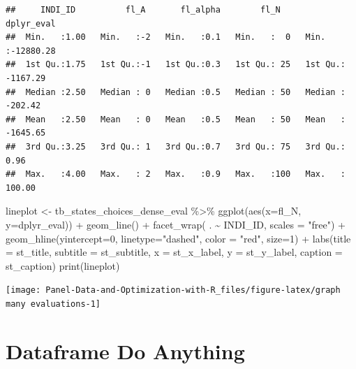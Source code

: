 \documentclass[
]{book}
\newenvironment{Shaded}{\begin{snugshade}}{\end{snugshade}}
\newcommand{\AttributeTok}[1]{\textcolor[rgb]{0.77,0.63,0.00}{#1}}
\newcommand{\DecValTok}[1]{\textcolor[rgb]{0.00,0.00,0.81}{#1}}
\newcommand{\FunctionTok}[1]{\textcolor[rgb]{0.00,0.00,0.00}{#1}}
\newcommand{\NormalTok}[1]{#1}
\newcommand{\OtherTok}[1]{\textcolor[rgb]{0.56,0.35,0.01}{#1}}
\newcommand{\SpecialCharTok}[1]{\textcolor[rgb]{0.00,0.00,0.00}{#1}}
\newcommand{\StringTok}[1]{\textcolor[rgb]{0.31,0.60,0.02}{#1}}
\begin{document}
\begin{verbatim}
##     INDI_ID          fl_A       fl_alpha        fl_N       dplyr_eval       
##  Min.   :1.00   Min.   :-2   Min.   :0.1   Min.   :  0   Min.   :-12880.28  
##  1st Qu.:1.75   1st Qu.:-1   1st Qu.:0.3   1st Qu.: 25   1st Qu.: -1167.29  
##  Median :2.50   Median : 0   Median :0.5   Median : 50   Median :  -202.42  
##  Mean   :2.50   Mean   : 0   Mean   :0.5   Mean   : 50   Mean   : -1645.65  
##  3rd Qu.:3.25   3rd Qu.: 1   3rd Qu.:0.7   3rd Qu.: 75   3rd Qu.:     0.96  
##  Max.   :4.00   Max.   : 2   Max.   :0.9   Max.   :100   Max.   :   100.00
\end{verbatim}

\begin{Shaded}
\begin{Highlighting}[]
\NormalTok{lineplot }\OtherTok{\textless{}{-}}\NormalTok{ tb\_states\_choices\_dense\_eval }\SpecialCharTok{\%\textgreater{}\%}
    \FunctionTok{ggplot}\NormalTok{(}\FunctionTok{aes}\NormalTok{(}\AttributeTok{x=}\NormalTok{fl\_N, }\AttributeTok{y=}\NormalTok{dplyr\_eval)) }\SpecialCharTok{+}
        \FunctionTok{geom\_line}\NormalTok{() }\SpecialCharTok{+}
        \FunctionTok{facet\_wrap}\NormalTok{( . }\SpecialCharTok{\textasciitilde{}}\NormalTok{ INDI\_ID, }\AttributeTok{scales =} \StringTok{"free"}\NormalTok{) }\SpecialCharTok{+}
        \FunctionTok{geom\_hline}\NormalTok{(}\AttributeTok{yintercept=}\DecValTok{0}\NormalTok{, }\AttributeTok{linetype=}\StringTok{"dashed"}\NormalTok{,}
                \AttributeTok{color =} \StringTok{"red"}\NormalTok{, }\AttributeTok{size=}\DecValTok{1}\NormalTok{) }\SpecialCharTok{+}
        \FunctionTok{labs}\NormalTok{(}\AttributeTok{title =}\NormalTok{ st\_title,}
             \AttributeTok{subtitle =}\NormalTok{ st\_subtitle,}
             \AttributeTok{x =}\NormalTok{ st\_x\_label,}
             \AttributeTok{y =}\NormalTok{ st\_y\_label,}
             \AttributeTok{caption =}\NormalTok{ st\_caption)}
\FunctionTok{print}\NormalTok{(lineplot)}
\end{Highlighting}
\end{Shaded}

\begin{center}\texttt{[image: Panel-Data-and-Optimization-with-R\_files/figure-latex/graph many evaluations-1]} \end{center}

\hypertarget{dataframe-do-anything}{%
\section{Dataframe Do Anything}\label{dataframe-do-anything}}
\end{document}
